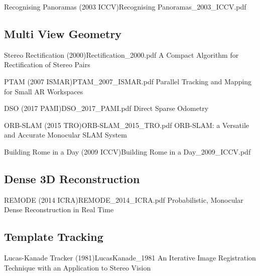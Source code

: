 \documentclass[10pt,a4paper]{scrartcl}
\begin{document}
\begin{multicols*}{2}
\begin{Paper}{Recognising Panoramas (2003 ICCV)}{Recognising Panoramas_2003_ICCV.pdf}
\end{Paper}

\subsection{Multi View Geometry}

\begin{Paper}{Stereo Rectification (2000)}{Rectification_2000.pdf}
A Compact Algorithm for Rectification of Stereo Pairs
\end{Paper}

\begin{Paper}{PTAM (2007 ISMAR)}{PTAM_2007_ISMAR.pdf}
Parallel Tracking and Mapping for Small AR Workspaces
\end{Paper}

\begin{Paper}{DSO (2017 PAMI)}{DSO_2017_PAMI.pdf}
Direct Sparse Odometry
\end{Paper}

\begin{Paper}{ORB-SLAM (2015 TRO)}{ORB-SLAM_2015_TRO.pdf}
ORB-SLAM: a Versatile and Accurate Monocular SLAM System
\end{Paper}

\begin{Paper}{Building Rome in a Day (2009 ICCV)}{Building Rome in a Day_2009_ICCV.pdf}
\end{Paper}

\subsection{Dense 3D Reconstruction}

\begin{Paper}{REMODE (2014 ICRA)}{REMODE_2014_ICRA.pdf}
Probabilistic, Monocular Dense Reconstruction in Real Time
\end{Paper}

\subsection{Template Tracking}

\begin{Paper}{Lucas-Kanade Tracker (1981)}{LucasKanade_1981}
An Iterative Image Registration Technique with an Application to Stereo Vision
\end{Paper}


\end{multicols*}
\end{document}
